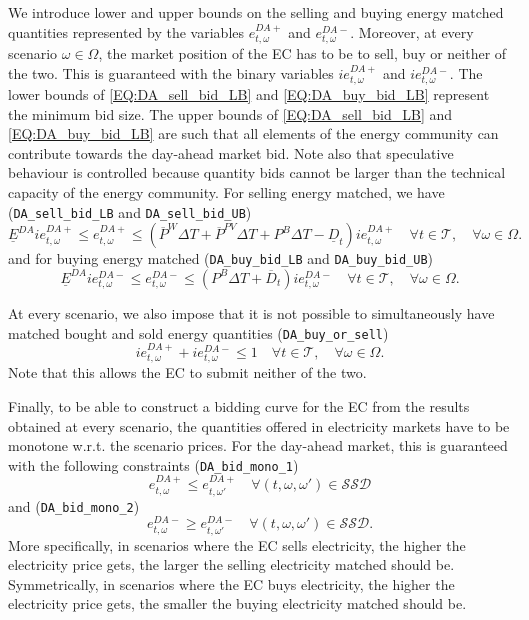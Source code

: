We introduce lower and upper bounds on the selling and buying energy matched quantities represented by the variables $e^{DA+}_{t, \omega}$ and $e^{DA-}_{t, \omega}$. Moreover, at every scenario $\omega \in \Omega$, the market position of the EC has to be to sell, buy or neither of the two. This is guaranteed with the binary variables $ie^{DA+}_{t, \omega}$ and $ie^{DA-}_{t, \omega}$. The lower bounds of \eqref{EQ:DA_sell_bid_LB} and \eqref{EQ:DA_buy_bid_LB} represent the minimum bid size. The upper bounds of \eqref{EQ:DA_sell_bid_LB} and \eqref{EQ:DA_buy_bid_LB} are such that all elements of the energy community can contribute towards the day-ahead market bid. Note also that speculative behaviour is controlled because quantity bids cannot be larger than the technical capacity of the energy community. For selling energy matched, we have (\verb|DA_sell_bid_LB| and \verb|DA_sell_bid_UB|)
\begin{equation} \label{EQ:DA_sell_bid_LB}
    \underline{E}^{DA} ie^{DA+}_{t, \omega} \leq e^{DA+}_{t, \omega} \leq (\overline{P}^W \Delta T + \overline{P}^{PV} \Delta T + P^B \Delta T - \underline{D}_t) ie^{DA+}_{t, \omega}  \quad \forall t \in \mathcal{T}, \quad \forall \omega \in \Omega.
\end{equation}
and for buying energy matched (\verb|DA_buy_bid_LB| and \verb|DA_buy_bid_UB|)
\begin{equation} \label{EQ:DA_buy_bid_LB}
	\underline{E}^{DA} ie^{DA-}_{t, \omega} \leq e^{DA-}_{t, \omega} \leq (P^B \Delta T + \overline{D}_t) ie^{DA-}_{t, \omega} \quad \forall t \in \mathcal{T}, \quad \forall \omega \in \Omega.
\end{equation}

At every scenario, we also impose that it is not possible to simultaneously have matched bought and sold energy quantities (\verb|DA_buy_or_sell|)
\begin{equation} \label{EQ:DA_buy_or_sell}
	ie^{DA+}_{t, \omega} + ie^{DA-}_{t, \omega} \leq 1 \quad \forall t \in \mathcal{T}, \quad \forall \omega \in \Omega.
\end{equation}
Note that this allows the EC to submit neither of the two.

Finally, to be able to construct a bidding curve for the EC from the results obtained at every scenario, the quantities offered in electricity markets have to be monotone w.r.t. the scenario prices. For the day-ahead market, this is guaranteed with the following constraints (\verb|DA_bid_mono_1|)
\begin{equation} \label{EQ:DA_bid_mono_1}
	e^{DA+}_{t, \omega} \leq e^{DA+}_{t, \omega'} \quad \forall (t, \omega, \omega') \in \mathcal{SSD}
\end{equation}
and (\verb|DA_bid_mono_2|)
\begin{equation} \label{EQ:DA_bid_mono_2}
	e^{DA-}_{t, \omega} \geq e^{DA-}_{t, \omega'} \quad \forall (t, \omega, \omega') \in \mathcal{SSD}.
\end{equation}
More specifically, in scenarios where the EC sells electricity, the higher the electricity price gets, the larger the selling electricity matched should be. Symmetrically, in scenarios where the EC buys electricity, the higher the electricity price gets, the smaller the buying electricity matched should be. 

